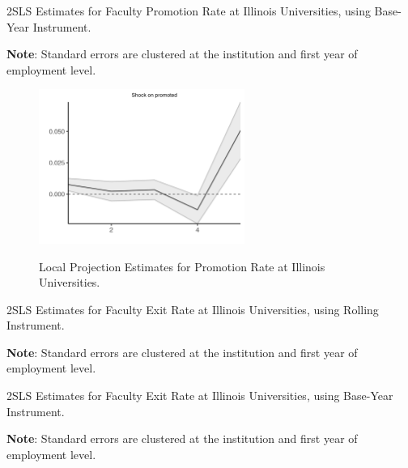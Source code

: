 \documentclass[notitlepage,12pt]{article}
\begin{document}
\begin{table}[H]
    \singlespacing
    \centering
    \caption{2SLS Estimates for Faculty Promotion Rate at Illinois Universities, using Base-Year Instrument.}
    \makebox[\textwidth][c]{}
    \begin{flushleft}
        \footnotesize
        \textbf{Note}: Standard errors are clustered at the institution and first year of employment level.
    \end{flushleft}
    \label{tab:promotion-shock-illinois}
\end{table}

\begin{figure}[H]
    \centering
    \singlespacing
    \caption{Local Projection Estimates for Promotion Rate at Illinois Universities.}
    \includegraphics[width=0.6\textwidth]{figures/promoted-illinois-lp-rolling.png}
    \label{fig:promoted-illinois-lp}
\end{figure}

\begin{table}[H]
    \singlespacing
    \centering
    \caption{2SLS Estimates for Faculty Exit Rate at Illinois Universities, using Rolling Instrument.}
    \makebox[\textwidth][c]{}
    \begin{flushleft}
        \footnotesize
        \textbf{Note}: Standard errors are clustered at the institution and first year of employment level.
    \end{flushleft}
    \label{tab:facultyleaving-shock-illinois-rolling}
\end{table}

\begin{table}[H]
    \singlespacing
    \centering
    \caption{2SLS Estimates for Faculty Exit Rate at Illinois Universities, using Base-Year Instrument.}
    \makebox[\textwidth][c]{}
    \begin{flushleft}
        \footnotesize
        \textbf{Note}: Standard errors are clustered at the institution and first year of employment level.
    \end{flushleft}
    \label{tab:facultyleaving-shock-illinois}
\end{table}
\end{document}
